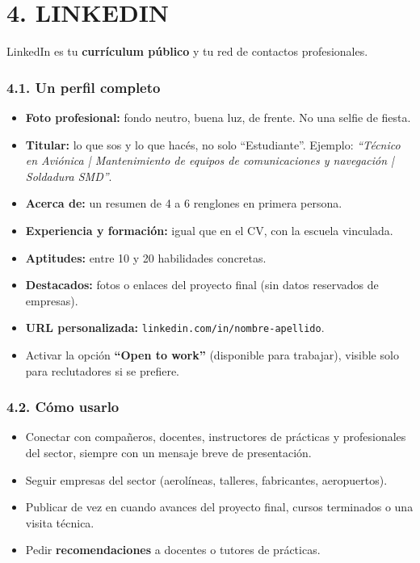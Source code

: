 \section*{4. LINKEDIN}

LinkedIn es tu \textbf{currículum público} y tu red de contactos profesionales.

\subsubsection*{4.1. Un perfil completo}
\begin{itemize}
  \item \textbf{Foto profesional:} fondo neutro, buena luz, de frente. No una selfie de fiesta.
  \item \textbf{Titular:} lo que sos y lo que hacés, no solo ``Estudiante''. Ejemplo:
        \textit{``Técnico en Aviónica | Mantenimiento de equipos de comunicaciones y navegación
        | Soldadura SMD''}.
  \item \textbf{Acerca de:} un resumen de 4 a 6 renglones en primera persona.
  \item \textbf{Experiencia y formación:} igual que en el CV, con la escuela vinculada.
  \item \textbf{Aptitudes:} entre 10 y 20 habilidades concretas.
  \item \textbf{Destacados:} fotos o enlaces del proyecto final (sin datos reservados de
        empresas).
  \item \textbf{URL personalizada:} \texttt{linkedin.com/in/nombre-apellido}.
  \item Activar la opción \textbf{``Open to work''} (disponible para trabajar), visible solo
        para reclutadores si se prefiere.
\end{itemize}

\subsubsection*{4.2. Cómo usarlo}
\begin{itemize}
  \item Conectar con compañeros, docentes, instructores de prácticas y profesionales del
        sector, siempre con un mensaje breve de presentación.
  \item Seguir empresas del sector (aerolíneas, talleres, fabricantes, aeropuertos).
  \item Publicar de vez en cuando avances del proyecto final, cursos terminados o una visita
        técnica.
  \item Pedir \textbf{recomendaciones} a docentes o tutores de prácticas.
\end{itemize}

